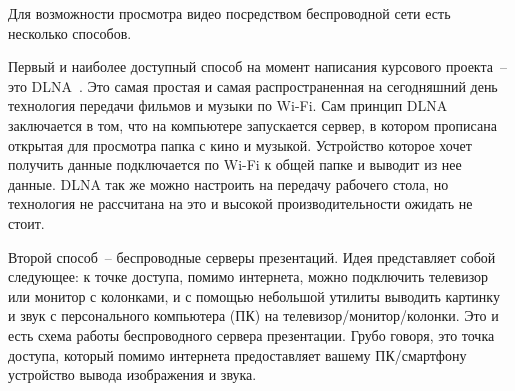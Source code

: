 

        
        
        
        
        

Для возможности просмотра видео посредством беспроводной сети есть несколько способов. 

Первый и наиболее доступный способ на момент написания курсового проекта~-- это DLNA~\cite{dlna_what_is}. Это самая простая и самая распространенная на сегодняшний день технология передачи фильмов и музыки по Wi-Fi. Сам принцип DLNA заключается в том, что на компьютере запускается сервер, в котором прописана открытая для просмотра папка с кино и музыкой. Устройство которое хочет получить данные подключается по Wi-Fi к общей папке и выводит из нее данные. DLNA так же можно настроить на передачу рабочего стола, но технология не рассчитана на это и высокой производительности ожидать не стоит. 

Второй способ~-- беспроводные серверы презентаций. Идея представляет собой следующее: к точке доступа, помимо интернета, можно подключить телевизор или монитор с колонками, и с помощью небольшой утилиты выводить картинку и звук с персонального компьютера (ПК) на телевизор/монитор/колонки. Это и есть схема работы беспроводного сервера презентации. Грубо говоря, это точка доступа, который помимо интернета предоставляет вашему ПК/смартфону устройство вывода изображения и звука.

